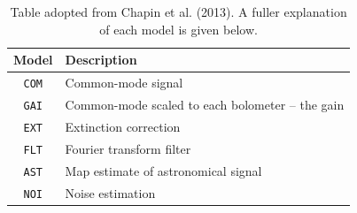 \documentclass[twoside,11pt]{article}
\newenvironment{latexonly}{}{}
\renewcommand{\_}{\texttt{\symbol{95}}}
\begin{document}
\begin{latexonly}
\setlength{\extrarowheight}{3pt}
\begin{table}[t!]
\centering
\begin{tabular}{c|l}
\hline
\textbf{Model} &\hspace{0.2cm} \textbf{Description} \\
\hline
\texttt{COM}&\hspace{0.2cm} Common-mode signal\\
\texttt{GAI}&\hspace{0.2cm} Common-mode scaled to each bolometer -- the gain\\
\texttt{EXT}&\hspace{0.2cm} Extinction correction\\
\texttt{FLT}&\hspace{0.2cm} Fourier transform filter\\
\texttt{AST}&\hspace{0.2cm} Map estimate of astronomical signal\\
\texttt{NOI}&\hspace{0.2cm} Noise estimation\\
\hline
\end{tabular}
\label{tab:mods}
\caption{\small Table adopted from Chapin et al. (2013). A fuller
explanation of each model is given below.}
\end{table}
\end{latexonly}
\end{document}
